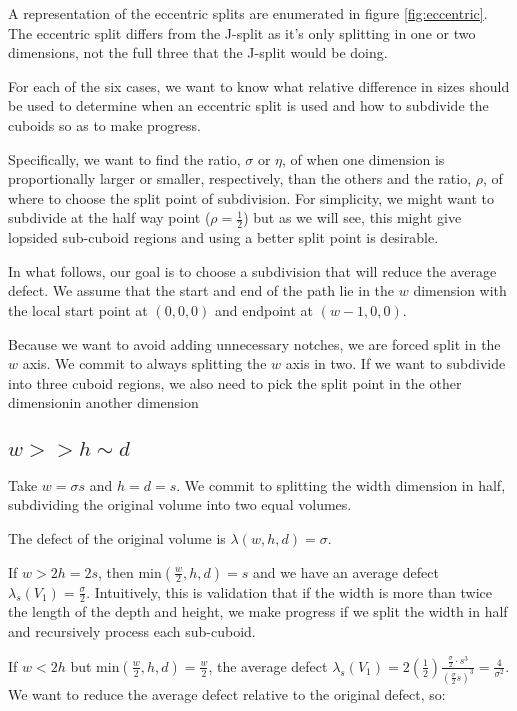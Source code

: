 A representation of the eccentric splits are enumerated in figure \ref{fig:eccentric}.
The eccentric split differs from the J-split as it's only splitting in one or two
dimensions, not the full three that the J-split would be doing.

For each of the six cases, we want to know what relative difference in sizes should be used
to determine when an eccentric split is used and how to subdivide the cuboids so as to make progress.

Specifically, we want to find the ratio, $\sigma$ or $\eta$, of when one dimension is proportionally larger or smaller,
respectively, than the others and the ratio, $\rho$, of where to choose the split point of subdivision.
For simplicity, we might want to subdivide at the half way point ($\rho = \frac{1}{2}$) but as we
will see, this might give lopsided sub-cuboid regions and using a better split point is desirable.

In what follows, our goal is to choose a subdivision that will reduce the average defect.
We assume that the start and end of the path lie in the $w$ dimension with the local start point at $(0,0,0)$
and endpoint at $(w-1,0,0)$.

Because we want to avoid adding unnecessary notches, we are forced split in the $w$ axis.
We commit to always splitting the $w$ axis in two.
If we want to subdivide into three cuboid regions, we also need to pick the split point in the other dimensionin another dimension

\subsection{$w >> h \sim d$}

Take $w = \sigma s$ and $h = d = s$.
We commit to splitting the width dimension in half, subdividing the original volume into two equal volumes.

The defect of the original volume is $\lambda(w,h,d) = \sigma$.

If $w > 2h = 2s$, then $\text{min}(\frac{w}{2},h,d) = s$ and we have an average defect $\lambda_s(V_1) = \frac{\sigma}{2}$.
Intuitively, this is validation that if the width is more than twice the length of the depth and height, we make progress
if we split the width in half and recursively process each sub-cuboid.

If $w < 2h$ but $\text{min}(\frac{w}{2},h,d) = \frac{w}{2}$,
the average defect $\lambda_s(V_1) = 2 (\frac{1}{2}) \frac{ \frac{\sigma}{2} \cdot s^3 }{ (\frac{\sigma}{2} s)^3 } = \frac{4}{\sigma^2}$.
We want to reduce the average defect relative to the original defect, so:

